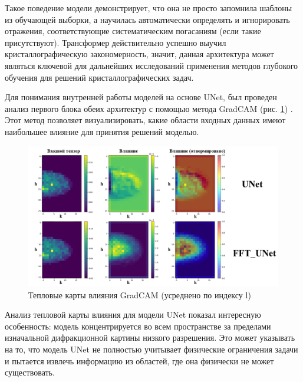 Такое поведение модели демонстрирует, что она не просто запомнила шаблоны из обучающей выборки, а научилась автоматически определять и игнорировать отражения, соответствующие систематическим погасаниям (если такие присутствуют). Трансформер действительно успешно выучил кристаллографическую закономерность, значит, данная архитектура может являться ключевой для дальнейших исследований применения методов глубокого обучения для решений кристаллографических задач.

Для понимания внутренней работы моделей на основе UNet, был проведен анализ первого блока обеих архитектур с помощью метода GradCAM (рис. \ref{gradcam}) \cite{selvaraju_grad-cam_2020}. Этот метод позволяет визуализировать, какие области входных данных имеют наибольшее влияние для принятия решений моделью.


\begin{figure}[H]
     \centering
     \includegraphics[width=1\textwidth]{figures/attribute_map.png}
     \caption{Тепловые карты влияния GradCAM (усреднено по индексу l)}
     \label{gradcam}
\end{figure}

%

Анализ тепловой карты влияния для модели UNet показал интересную особенность: модель концентрируется во всем пространстве за пределами изначальной дифракционной картины низкого разрешения. Это может указывать на то, что модель UNet не полностью учитывает физические ограничения задачи и пытается извлечь информацию из областей, где она физически не может существовать. 

